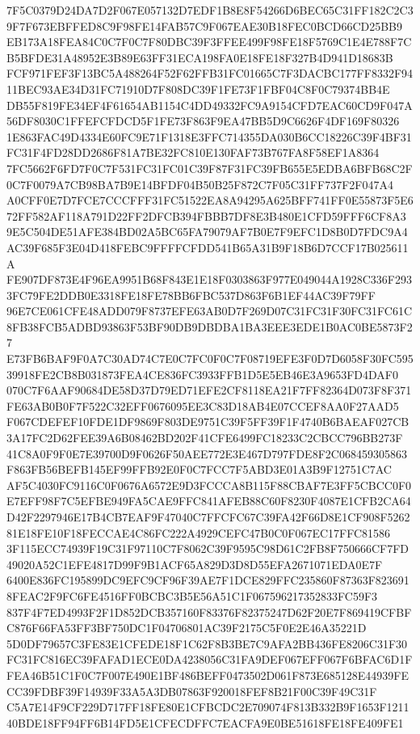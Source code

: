\documentclass[UTF8,fontset=fandol,zihao=-4,a4paper]{ctexart}
\begin{document}
{{7F5C0379D24DA7D2F067E057132D7EDF1B8E8F54266D6BEC65C31FF182C2C39F7F673EBFFED8C9F98FE14FAB57C9F067EAE30B18FEC0BCD66CD25BB9
EB173A18FEA84C0C7F0C7F80DBC39F3FFEE499F98FE18F5769C1E4E788F7CB5BFDE31A48952E3B89E63FF31ECA198FA0E18FE18F327B4D941D18683B
FCF971FEF3F13BC5A488264F52F62FFB31FC01665C7F3DACBC177FF8332F9411BEC93AE34D31FC71910D7F808DC39F1FE73F1FBF04C8F0C79374BB4E
DB55F819FE34EF4F61654AB1154C4DD49332FC9A9154CFD7EAC60CD9F047A56DF8030C1FFEFCFDCD5F1FE73F863F9EA47BB5D9C6626F4DF169F80326
1E863FAC49D4334E60FC9E71F1318E3FFC714355DA030B6CC18226C39F4BF31FC31F4FD28DD2686F81A7BE32FC810E130FAF73B767FA8F58EF1A8364
7FC5662F6FD7F0C7F531FC31FC01C39F87F31FC39FB655E5EDBA6BFB68C2F0C7F0079A7CB98BA7B9E14BFDF04B50B25F872C7F05C31FF737F2F047A4
A0CFF0E7D7FCE7CCCFFF31FC51522EA8A94295A625BFF741FF0E55873F5E672FF582AF118A791D22FF2DFCB394FBBB7DF8E3B480E1CFD59FFF6CF8A3
9E5C504DE51AFE384BD02A5BC65FA79079AF7B0E7F9EFC1D8B0D7FDC9A4AC39F685F3E04D418FEBC9FFFFCFDD541B65A31B9F18B6D7CCF17B025611A
FE907DF873E4F96EA9951B68F843E1E18F0303863F977E049044A1928C336F2933FC79FE2DDB0E3318FE18FE78BB6FBC537D863F6B1EF44AC39F79FF
96E7CE061CFE48ADD079F8737EFE63AB0D7F269D07C31FC31F30FC31FC61C8FB38FCB5ADBD93863F53BF90DB9DBDBA1BA3EEE3EDE1B0AC0BE5873F27
E73FB6BAF9F0A7C30AD74C7E0C7FC0F0C7F08719EFE3F0D7D6058F30FC59539918FE2CB8B031873FEA4CE836FC3933FFB1D5E5EB46E3A9653FD4DAF0
070C7F6AAF90684DE58D37D79ED71EFE2CF8118EA21F7FF82364D073F8F371FE63AB0B0F7F522C32EFF0676095EE3C83D18AB4E07CCEF8AA0F27AAD5
F067CDEFEF10FDE1DF9869F803DE9751C39F5FF39F1F4740B6BAEAF027CB3A17FC2D62FEE39A6B08462BD202F41CFE6499FC18233C2CBCC796BB273F
41C8A0F9F0E7E39700D9F0626F50AEE772E3E467D797FDE8F2C068459305863F863FB56BEFB145EF99FFB92E0F0C7FCC7F5ABD3E01A3B9F12751C7AC
AF5C4030FC9116C0F0676A6572E9D3FCCCA8B115F88CBAF7E3FF5CBCC0F0E7EFF98F7C5EFBE949FA5CAE9FFC841AFEB88C60F8230F4087E1CFB2CA64
D42F2297946E17B4CB7EAF9F47040C7FFCFC67C39FA42F66D8E1CF908F526281E18FE10F18FECCAE4C86FC222A4929CEFC47B0C0F067EC17FFC81586
3F115ECC74939F19C31F97110C7F8062C39F9595C98D61C2FB8F750666CF7FD49020A52C1EFE4817D99F9B1ACF65A829D3D8D55EFA2671071EDA0E7F
6400E836FC195899DC9EFC9CF96F39AE7F1DCE829FFC235860F87363F8236918FEAC2F9FC6FE4516FF0BCBC3B5E56A51C1F067596217352833FC59F3
837F4F7ED4993F2F1D852DCB357160F83376F82375247D62F20E7F869419CFBFC876F66FA53FF3BF750DC1F04706801AC39F2175C5F0E2E46A35221D
5D0DF79657C3FE83E1CFEDE18F1C62F8B3BE7C9AFA2BB436FE8206C31F30FC31FC816EC39FAFAD1ECE0DA4238056C31FA9DEF067EFF067F6BFAC6D1F
FEA46B51C1F0C7F007E490E1BF486BEFF0473502D061F873E685128E44939FECC39FDBF39F14939F33A5A3DB07863F920018FEF8B21F00C39F49C31F
C5A7E14F9CF229D717FF18FE80E1CFBCDC2E709074F813B332B9F1653F121140BDE18FF94FF6B14FD5E1CFECDFFC7EACFA9E0BE51618FE18FE409FE1
}}
\end{document}
